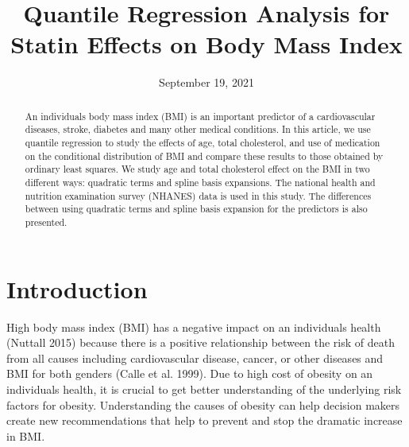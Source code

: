 \documentclass[
  12pt,
]{article}
\title{Quantile Regression Analysis for Statin Effects on Body Mass Index}
\author{}
\date{\vspace{-2.5em}September 19, 2021}
\begin{document}
\maketitle
\begin{abstract}
An individuals body mass index (BMI) is an important predictor of a cardiovascular diseases, stroke, diabetes and many other medical conditions. In this article, we use quantile regression to study the effects of age, total cholesterol, and use of medication on the conditional distribution of BMI and compare these results to those obtained by ordinary least squares. We study age and total cholesterol effect on the BMI in two different ways: quadratic terms and spline basis expansions. The national health and nutrition examination survey (NHANES) data is used in this study. The differences between using quadratic terms and spline basis expansion for the predictors is also presented.
\end{abstract}

{
\setcounter{tocdepth}{2}
\tableofcontents
}
\newpage
\section{Introduction}

High body mass index (BMI) has a negative impact on an individuals health (Nuttall 2015) because there is a positive relationship between the risk of death from all causes including cardiovascular disease, cancer, or other diseases and BMI for both genders (Calle et al. 1999). Due to high cost of obesity on an individuals health, it is crucial to get better understanding of the underlying risk factors for obesity. Understanding the causes of obesity can help decision makers create new recommendations that help to prevent and stop the dramatic increase in BMI.
\end{document}
